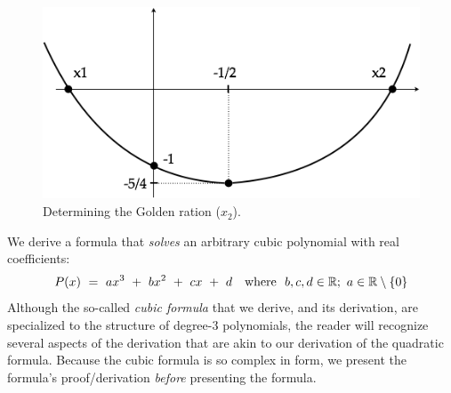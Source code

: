 \begin{figure}[htb]
\begin{center}
       \includegraphics[scale=0.4]{FiguresArithmetic/SecondDegreeFibo}
\caption{Determining the Golden ration ($x_2$).}
\label{fig:SecondDegreeFibo}
\end{center}
\end{figure}

\bigskip


\noindent
We derive a formula that {\it solves} an arbitrary cubic polynomial
 with real coefficients:
\begin{equation}
\label{eq:generic-cubic-1}
P(x) \ = \  ax^3 \ + \ bx^2 \ + \ cx \ + \ d \ \ \mbox{  where  }
\ b,c, d  \in \mathbb{R};\ a \in \mathbb{R} \setminus \{0\}
\end{equation}
Although the so-called {\em cubic formula} that we derive, and its
derivation, are specialized to the structure of degree-$3$
polynomials, the reader will recognize several aspects of the
derivation that are akin to our derivation of the quadratic formula.
Because the cubic formula is so complex in form, we present the
formula's proof/derivation {\em before} presenting the formula.

